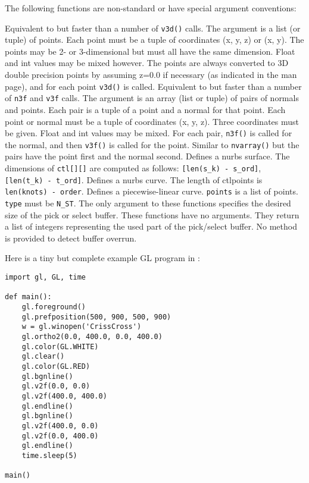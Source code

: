 The following functions are non-standard or have special argument
conventions:
\begin{description}
Equivalent to but faster than a number of
{\tt v3d()}
calls.
The argument is a list (or tuple) of points.
Each point must be a tuple of coordinates (x, y, z) or (x, y).
The points may be 2- or 3-dimensional but must all have the
same dimension.
Float and int values may be mixed however.
The points are always converted to 3D double precision points
by assuming z=0.0 if necessary (as indicated in the man page),
and for each point
{\tt v3d()}
is called.
Equivalent to but faster than a number of
{\tt n3f}
and
{\tt v3f}
calls.
The argument is an array (list or tuple) of pairs of normals and points.
Each pair is a tuple of a point and a normal for that point.
Each point or normal must be a tuple of coordinates (x, y, z).
Three coordinates must be given.
Float and int values may be mixed.
For each pair,
{\tt n3f()}
is called for the normal, and then
{\tt v3f()}
is called for the point.
Similar to 
{\tt nvarray()}
but the pairs have the point first and the normal second.
\itembreak
Defines a nurbs surface.
The dimensions of
{\tt ctl[][]}
are computed as follows:
{\tt [len(s\_k)~-~s\_ord]},
{\tt [len(t\_k)~-~t\_ord]}.
Defines a nurbs curve.
The length of ctlpoints is
{\tt len(knots)~-~order}.
Defines a piecewise-linear curve.
{\tt points}
is a list of points.
{\tt type}
must be
{\tt N\_ST}.
The only argument to these functions specifies the desired size of the
pick or select buffer.
These functions have no arguments.
They return a list of integers representing the used part of the
pick/select buffer.
No method is provided to detect buffer overrun.
\end{description}

Here is a tiny but complete example GL program in {\Python}:
\bcode\begin{verbatim}
import gl, GL, time

def main():
    gl.foreground()
    gl.prefposition(500, 900, 500, 900)
    w = gl.winopen('CrissCross')
    gl.ortho2(0.0, 400.0, 0.0, 400.0)
    gl.color(GL.WHITE)
    gl.clear()
    gl.color(GL.RED)
    gl.bgnline()
    gl.v2f(0.0, 0.0)
    gl.v2f(400.0, 400.0)
    gl.endline()
    gl.bgnline()
    gl.v2f(400.0, 0.0)
    gl.v2f(0.0, 400.0)
    gl.endline()
    time.sleep(5)

main()
\end{verbatim}\ecode

